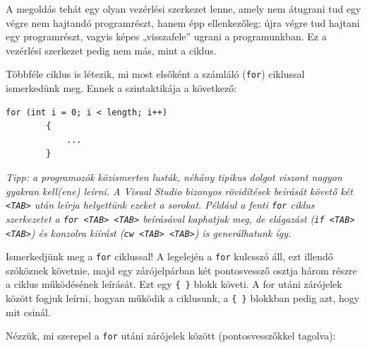 \documentclass[a4paper]{article}
\begin{document}
	A megoldás tehát egy olyan vezérlési szerkezet lenne, amely nem átugrani tud egy végre nem hajtandó programrészt, hanem épp ellenkezőleg: újra végre tud hajtani egy programrészt, vagyis képes „visszafele” ugrani a programunkban. Ez a vezérlési szerkezet pedig nem más, mint a ciklus.
	
	Többféle ciklus is létezik, mi most elsőként a számláló (\lstinline{for}) ciklussal ismerkedünk meg. Ennek a szintaktikája a következő:
	
	\begin{lstlisting}[caption=Számláló ciklus, label=lst:for]
		for (int i = 0; i < length; i++)
		{
			...
		}
	\end{lstlisting}
	
	\emph{Tipp: a programozók közismerten lusták, néhány tipikus dolgot viszont nagyon gyakran kell(ene) leírni. A Visual Studio bizonyos rövidítések beírását követő két \lstinline{<TAB>} után leírja helyettünk ezeket a sorokat. Például a fenti \lstinline{for} ciklus szerkezetet a \lstinline{for <TAB> <TAB>} beírásával kaphatjuk meg, de elágazást (\lstinline{if <TAB> <TAB>}) és konzolra kiírást (\lstinline{cw <TAB> <TAB>}) is generálhatunk így.}
	
	Ismerkedjünk meg a \lstinline{for} ciklussal! A legelején a \lstinline{for} kulcsszó áll, ezt illendő szóköznek követnie, majd egy zárójelpárban két pontosvessző osztja három részre a ciklus működésének leírását. Ezt egy \lstinline!{ }! blokk követi. A for utáni zárójelek között fogjuk leírni, hogyan működik a ciklusunk, a \lstinline!{ }! blokkban pedig azt, hogy mit csinál.
	
	Nézzük, mi szerepel a \lstinline{for} utáni zárójelek között (pontosvesszőkkel tagolva):
	
\end{document}
